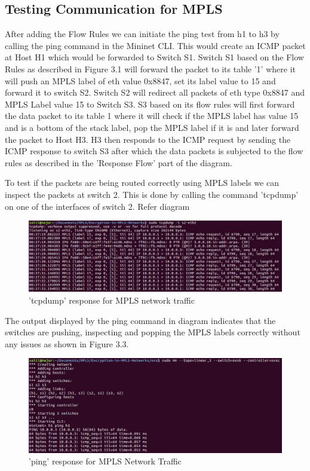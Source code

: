 \subsection{Testing Communication for MPLS}
After adding the Flow Rules we can initiate the ping test from h1 to h3 by calling the ping command in the Mininet CLI. This would create an ICMP packet at Host H1 which would be forwarded to Switch S1. Switch S1 based on the Flow Rules as described in Figure 3.1 will forward the packet to its table '1' where it will push an MPLS label of eth value 0x8847, set its label value to 15 and forward it to switch S2. Switch S2 will redirect all packets of eth type 0x8847 and MPLS Label value 15 to Switch S3. S3 based on its flow rules will first forward the data packet to its table 1 where it will check if the MPLS label has value 15 and is a bottom of the stack label, pop the MPLS label if it is and later forward the packet to Host H3. H3 then responds to the ICMP request by sending the ICMP response to switch S3 after which the data packets is subjected to the flow rules as described in the 'Response Flow' part of the diagram.

To test if the packets are being routed correctly using MPLS labels we can inspect the packets at switch 2. This is done by calling the command 'tcpdump' on one of the interfaces of switch 2. Refer diagram

\begin{figure}[H]
       \centering\includegraphics[width=\textwidth]{images/11_TCP_Dump_Capture_for_MPLS.JPG}
       \caption{'tcpdump' response for MPLS network traffic}
       \label{fig:compbest}
\end{figure}

The output displayed by the ping command in diagram indicates that the switches are pushing, inspecting and popping the MPLS labels correctly without any issues as shown in Figure 3.3.

\begin{figure}[H]
       \centering\includegraphics[width=\textwidth]{images/12_ICMP_responce_for_MPLS.JPG}
       \caption{'ping' response for MPLS Network Traffic}
       \label{fig:compbest}
\end{figure}


